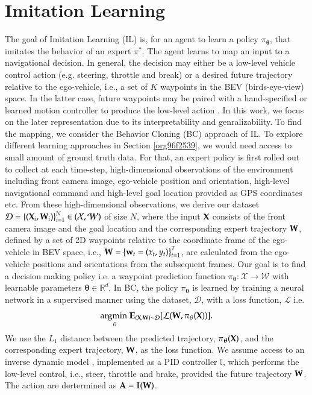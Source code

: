\documentclass[12pt, letterpaper,cleardoubleempty,BCOR1cm]{scrbook}
\begin{document}
\section{Imitation Learning \label{orgb2e7131}}
\label{sec:org24ff038}
The goal of Imitation Learning (IL) is, for an agent to learn a policy
\(\pi_{\boldsymbol{\theta}}\), that imitates the behavior of an expert \(\pi^{*}\). The
agent learns to map an input to a navigational decision. In general, the
decision may either be a low-level vehicle control action
\cite{Codevilla2019} (e.g. steering, throttle and break) or a desired future
trajectory relative to the ego-vehicle, i.e., a set of \(K\) waypoints
\cite{Chen2019,Mueller2018} in the BEV (birds-eye-view) space. In the latter
case, future waypoints may be paired with a hand-specified or learned motion
controller to produce the low-level action \cite{Chen2019,Mueller2018}. In
this work, we focus on the later representation due to its interpretability
and genralizability. To find the mapping, we consider the Behavior Cloning
(BC) approach of IL. To explore different learning approaches in Section
\ref{org96f2539}, we would need access to small amount of ground truth
data. For that, an expert policy is first rolled out to collect at each
time-step, high-dimensional observations of the environment including front
camera image, ego-vehicle position and orientation, high-level navigational
command and high-level goal location provided as GPS coordinates etc. From
these high-dimensional observations, we derive our dataset \(\mathcal{D} = \left\lbrace (\textbf
   X_{i}, \textbf W_{i}) \right\rbrace_{i=1}^{N}\in(\mathcal{X},\mathcal{W})\) of size \(N\), where the input
\(\textbf X\) consists of the front camera image and the goal location and the
corresponding expert trajectory \(\textbf W\), defined by a set of 2D waypoints
relative to the coordinate frame of the ego-vehicle in BEV space, i.e., \(\textbf
   W=\left\lbrace \textbf w_{t}=(x_{t},y_{t}) \right\rbrace_{t=1}^{T}\), are calculated from the
ego-vehicle positions and orientations from the subsequent frames. Our goal
is to find a decision making policy i.e. a waypoint prediction function
\(\pi_{\boldsymbol{\theta}}:\mathcal{X}\to\mathcal{W}\) with learnable parameters
\(\boldsymbol{\theta}\in\mathbb{R}^{d}\). In BC, the policy \(\pi_{\boldsymbol{\theta}}\) is learned by
training a neural network in a supervised manner using the dataset, \(\mathcal{D}\),
with a loss function, \(\mathcal{L}\) i.e.  \[\underset{{\theta}}{\text{argmin }} \mathbb{E}_{(\textbf
   X,\textbf W)\sim \mathcal{D}} [\mathcal{L}(\textbf W,\pi_{\theta}(\textbf X))].\] We use the \(L_{1}\)
distance between the predicted trajectory, \(\pi_{\boldsymbol{\theta}}(\textbf X)\), and the
corresponding expert trajectory, \(\textbf W\), as the loss function. We assume
access to an inverse dynamic model \cite{10.2307/j.ctt183ph6v}, implemented
as a PID controller \(\mathbb{I}\), which performs the low-level control, i.e.,
steer, throttle and brake, provided the future trajectory \(\textbf W\). The
action are dertermined as \(\textbf A=\mathbb{I}(\textbf W)\).
\end{document}
